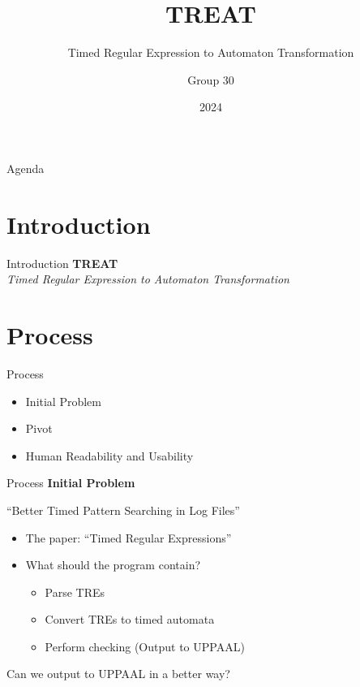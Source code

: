 \documentclass{beamer}
\title{TREAT}
\subtitle{Timed Regular Expression to Automaton Transformation}
\author{Group 30}
\institute{Aalborg Universitet}
\date{2024}
\begin{document}
\frame{\titlepage}

\begin{frame}{Agenda}
    \tableofcontents
\end{frame}

\section{Introduction} %


\begin{frame}{Introduction}
    \centering
    \LARGE\textbf{TREAT} \\
    \vspace{0.5cm}
    \Large\textit{Timed Regular Expression to Automaton Transformation}
\end{frame}

\section{Process}

\begin{frame}{Process}
    \begin{itemize}
        \item Initial Problem
        \item Pivot
        \item Human Readability and Usability
    \end{itemize}
\end{frame}

\begin{frame}{Process}
    \textbf{Initial Problem}

    ``Better Timed Pattern Searching in Log Files''
    \newline
    \begin{itemize}
        \item The paper: ``Timed Regular Expressions''
        \item What should the program contain?
        \begin{itemize}
            \item Parse TREs
            \item Convert TREs to timed automata
            \item Perform checking (Output to UPPAAL)
        \end{itemize}
    \end{itemize}

    Can we output to UPPAAL in a better way?
\end{frame}
\end{document}
